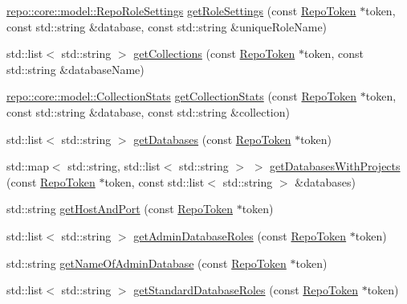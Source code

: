 \begin{DoxyCompactItemize}
\item 
\hyperlink{classrepo_1_1core_1_1model_1_1_repo_role_settings}{repo\+::core\+::model\+::\+Repo\+Role\+Settings} \hyperlink{classrepo_1_1_repo_controller_aa5ba4cab2fa64ed2766ce873b6201450}{get\+Role\+Settings} (const \hyperlink{class_repo_controller_1_1_repo_token}{Repo\+Token} $\ast$token, const std\+::string \&database, const std\+::string \&unique\+Role\+Name)
\item 
std\+::list$<$ std\+::string $>$ \hyperlink{classrepo_1_1_repo_controller_a42d3ab92e05996c4280c3c8f53e149d1}{get\+Collections} (const \hyperlink{class_repo_controller_1_1_repo_token}{Repo\+Token} $\ast$token, const std\+::string \&database\+Name)
\item 
\hyperlink{classrepo_1_1core_1_1model_1_1_collection_stats}{repo\+::core\+::model\+::\+Collection\+Stats} \hyperlink{classrepo_1_1_repo_controller_aa0c84fd751f50247d160b22903e55f4d}{get\+Collection\+Stats} (const \hyperlink{class_repo_controller_1_1_repo_token}{Repo\+Token} $\ast$token, const std\+::string \&database, const std\+::string \&collection)
\item 
std\+::list$<$ std\+::string $>$ \hyperlink{classrepo_1_1_repo_controller_aa68f93756324bdb10b9093ae921ca6b7}{get\+Databases} (const \hyperlink{class_repo_controller_1_1_repo_token}{Repo\+Token} $\ast$token)
\item 
std\+::map$<$ std\+::string, std\+::list$<$ std\+::string $>$ $>$ \hyperlink{classrepo_1_1_repo_controller_a9af309f40484749bcf2caa59a75f4935}{get\+Databases\+With\+Projects} (const \hyperlink{class_repo_controller_1_1_repo_token}{Repo\+Token} $\ast$token, const std\+::list$<$ std\+::string $>$ \&databases)
\item 
std\+::string \hyperlink{classrepo_1_1_repo_controller_ae64dc6ffba46875245d83b5c325a94d5}{get\+Host\+And\+Port} (const \hyperlink{class_repo_controller_1_1_repo_token}{Repo\+Token} $\ast$token)
\item 
std\+::list$<$ std\+::string $>$ \hyperlink{classrepo_1_1_repo_controller_aee2deab28e41511fec4db90fc732aeca}{get\+Admin\+Database\+Roles} (const \hyperlink{class_repo_controller_1_1_repo_token}{Repo\+Token} $\ast$token)
\item 
std\+::string \hyperlink{classrepo_1_1_repo_controller_a88d01aafa6aae4237ff4d7017ec84ff5}{get\+Name\+Of\+Admin\+Database} (const \hyperlink{class_repo_controller_1_1_repo_token}{Repo\+Token} $\ast$token)
\item 
std\+::list$<$ std\+::string $>$ \hyperlink{classrepo_1_1_repo_controller_aa0e742c2227bc478b8c8dbeafe24a767}{get\+Standard\+Database\+Roles} (const \hyperlink{class_repo_controller_1_1_repo_token}{Repo\+Token} $\ast$token)

\end{DoxyCompactItemize}
